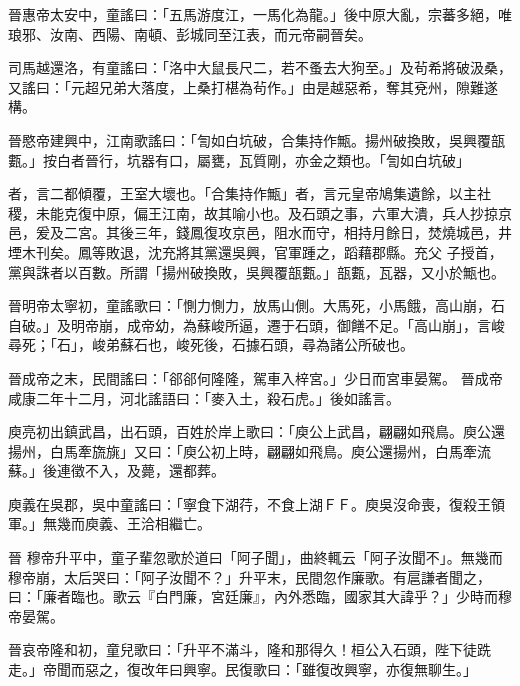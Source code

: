 \begin{pinyinscope}
 晉惠帝太安中，童謠曰：「五馬游度江，一馬化為龍。」後中原大亂，宗蕃多絕，唯琅邪、汝南、西陽、南頓、彭城同至江表，而元帝嗣晉矣。



 司馬越還洛，有童謠曰：「洛中大鼠長尺二，若不蚤去大狗至。」及茍希將破汲桑，又謠曰：「元超兄弟大落度，上桑打椹為茍作。」由是越惡希，奪其兗州，隙難遂構。



 晉愍帝建興中，江南歌謠曰：「訇如白坑破，合集持作甒。揚州破換敗，吳興覆瓿甊。」按白者晉行，坑器有口，屬甕，瓦質剛，亦金之類也。「訇如白坑破」



 者，言二都傾覆，王室大壞也。「合集持作甒」者，言元皇帝鳩集遺餘，以主社稷，未能克復中原，偏王江南，故其喻小也。及石頭之事，六軍大潰，兵人抄掠京邑，爰及二宮。其後三年，錢鳳復攻京邑，阻水而守，相持月餘日，焚燒城邑，井堙木刊矣。鳳等敗退，沈充將其黨還吳興，官軍踵之，蹈藉郡縣。充父
 子授首，黨與誅者以百數。所謂「揚州破換敗，吳興覆瓿甊。」瓿甊，瓦器，又小於甒也。



 晉明帝太寧初，童謠歌曰：「惻力惻力，放馬山側。大馬死，小馬餓，高山崩，石自破。」及明帝崩，成帝幼，為蘇峻所逼，遷于石頭，御饍不足。「高山崩」，言峻尋死；「石」，峻弟蘇石也，峻死後，石據石頭，尋為諸公所破也。



 晉成帝之末，民間謠曰：「郤郤何隆隆，駕車入梓宮。」少日而宮車晏駕。
 晉成帝咸康二年十二月，河北謠語曰：「麥入土，殺石虎。」後如謠言。



 庾亮初出鎮武昌，出石頭，百姓於岸上歌曰：「庾公上武昌，翩翩如飛鳥。庾公還揚州，白馬牽旒旐」又曰：「庾公初上時，翩翩如飛鳥。庾公還揚州，白馬牽流蘇。」後連徵不入，及薨，還都葬。



 庾義在吳郡，吳中童謠曰：「寧食下湖荇，不食上湖ＦＦ。庾吳沒命喪，復殺王領軍。」無幾而庾義、王洽相繼亡。



 晉
 穆帝升平中，童子輩忽歌於道曰「阿子聞」，曲終輒云「阿子汝聞不」。無幾而穆帝崩，太后哭曰：「阿子汝聞不？」升平末，民間忽作廉歌。有扈謙者聞之，曰：「廉者臨也。歌云『白門廉，宮廷廉』，內外悉臨，國家其大諱乎？」少時而穆帝晏駕。



 晉哀帝隆和初，童兒歌曰：「升平不滿斗，隆和那得久！桓公入石頭，陛下徒跣走。」帝聞而惡之，復改年曰興寧。民復歌曰：「雖復改興寧，亦復無聊生。」




\end{pinyinscope}
